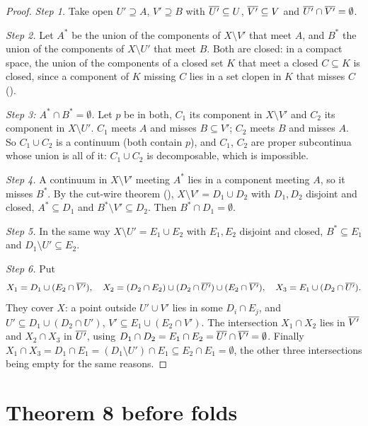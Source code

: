 \begin{proof}
\emph{Step 1.} Take open $U'\supseteq A$, $V'\supseteq B$ with $\overline{U'}\subseteq U$, $\overline{V'}\subseteq V$ and $\overline{U'}\cap\overline{V'}=\emptyset$.

\emph{Step 2.} Let $A^*$ be the union of the components of $X\setminus V'$ that meet $A$, and $B^*$ the union of the components of $X\setminus U'$ that meet $B$.
Both are closed: in a compact space, the union of the components of a closed set $K$ that meet a closed $C\subseteq K$ is closed, since a component of $K$
missing $C$ lies in a set clopen in $K$ that misses $C$ ().

\emph{Step 3: $A^*\cap B^*=\emptyset$.} Let $p$ be in both, $C_1$ its component in $X\setminus V'$ and $C_2$ its component in $X\setminus U'$. $C_1$ meets $A$ and
misses $B\subseteq V'$; $C_2$ meets $B$ and misses $A$. So $C_1\cup C_2$ is a continuum (both contain $p$), and $C_1$, $C_2$ are proper subcontinua whose union
is all of it: $C_1\cup C_2$ is decomposable, which is impossible.

\emph{Step 4.} A continuum in $X\setminus V'$ meeting $A^*$ lies in a component meeting $A$, so it misses $B^*$. By the cut-wire theorem
(), $X\setminus V'=D_1\cup D_2$ with $D_1,D_2$ disjoint and closed, $A^*\subseteq D_1$ and $B^*\setminus V'\subseteq D_2$. Then $B^*\cap D_1=\emptyset$.

\emph{Step 5.} In the same way $X\setminus U'=E_1\cup E_2$ with $E_1,E_2$ disjoint and closed, $B^*\subseteq E_1$ and $D_1\setminus U'\subseteq E_2$.

\emph{Step 6.} Put
\[
X_1=D_1\cup(E_2\cap\overline{V'}),\quad X_2=(D_2\cap E_2)\cup(D_2\cap\overline{U'})\cup(E_2\cap\overline{V'}),\quad X_3=E_1\cup(D_2\cap\overline{U'}).
\]
They cover $X$: a point outside $U'\cup V'$ lies in some $D_i\cap E_j$, and $U'\subseteq D_1\cup(D_2\cap U')$, $V'\subseteq E_1\cup(E_2\cap V')$. The
intersection $X_1\cap X_2$ lies in $\overline{V'}$ and $X_2\cap X_3$ in $\overline{U'}$, using $D_1\cap D_2=E_1\cap E_2=\overline{U'}\cap\overline{V'}=\emptyset$. Finally
$X_1\cap X_3=D_1\cap E_1=(D_1\setminus U')\cap E_1\subseteq E_2\cap E_1=\emptyset$, the other three intersections being empty for the same reasons.
\end{proof}


\section{Theorem 8 before folds}


